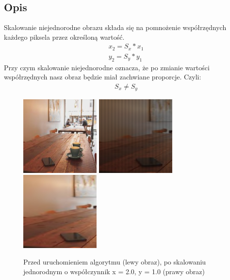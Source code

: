\documentclass[a4paper,12pt]{book}
\begin{document}
\subsection*{Opis}
Skalowanie niejednorodne obrazu składa się na pomnożenie współrzędnych każdego piksela przez określoną wartość. 
\begin{gather}
x_2 = S_x * x_1 \\
y_2 = S_y * y_1
\end{gather}
Przy czym skalowanie niejednorodne oznacza, że po zmianie wartości współrzędnych nasz obraz będzie miał zachwiane proporcje. Czyli: 
\begin{gather}
S_x \neq S_y
\end{gather}
\begin{figure}[H]
	\caption{Przed uruchomieniem algorytmu (lewy obraz), po skalowaniu jednorodnym o współczynnik x = 2.0, y = 1.0 (prawy obraz)}
	\includegraphics[width=4cm, height=4cm]{coffee-unmodified.jpg}
	\includegraphics[width=4cm, height=4cm]{coffee-nonuniform-scaling-without-interpolation.png}
	\includegraphics[width=4cm, height=4cm]{coffee-nonuniform-scaling.png}
\end{figure}
\end{document}
